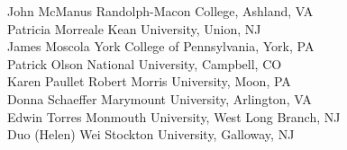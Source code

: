\documentclass{article}
\begin{document}
{John McManus \dotfill Randolph-Macon College, Ashland, VA\\
Patricia Morreale \dotfill Kean University, Union, NJ\\
James Moscola \dotfill York College of Pennsylvania, York, PA\\
Patrick Olson \dotfill National University, Campbell, CO\\
Karen Paullet \dotfill Robert Morris University, Moon, PA\\
Donna Schaeffer \dotfill Marymount University, Arlington, VA\\
Edwin Torres \dotfill Monmouth University, West Long Branch, NJ\\
Duo (Helen) Wei \dotfill Stockton University, Galloway, NJ\\
}
\end{document}
